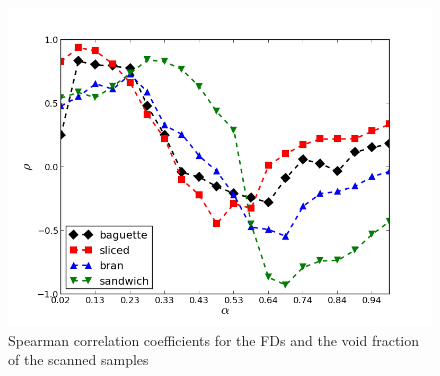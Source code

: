 




\begin{figure}[htb]
\centering
\includegraphics[scale=0.4]{../images/Fig7}
\caption{Spearman correlation coefficients for the FDs and the void fraction of the scanned samples}
\label{fig:corrVF}
\end{figure}

